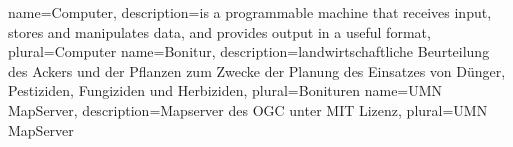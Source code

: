{
  name=Computer,
  description={is a programmable machine that receives input,
               stores and manipulates data, and provides
               output in a useful format},
  plural=Computer
}
{
  name=Bonitur,
  description={landwirtschaftliche Beurteilung des Ackers und der Pflanzen zum Zwecke der Planung des Einsatzes von Dünger, Pestiziden, Fungiziden und Herbiziden},
  plural=Bonituren
}
{
  name=UMN MapServer,
  description={Mapserver des OGC unter MIT Lizenz},
  plural=UMN MapServer
}